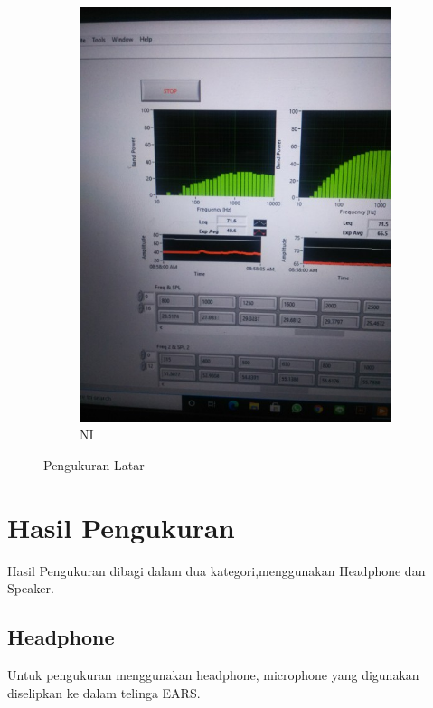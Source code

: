\documentclass[12pt,]{article}
\begin{document}
\begin{figure}[!ht]
\begin{subfigure}[b]{0.25\textwidth}
			\includegraphics[width=\textwidth]{images/noise_ni}
			\caption{NI}
		\end{subfigure}
		\caption{Pengukuran Latar}
	\end{figure}

	
	\newpage
	\section{Hasil Pengukuran}
	
	Hasil Pengukuran dibagi dalam dua kategori,menggunakan Headphone dan Speaker.
	
	\subsection{Headphone}
	
	Untuk pengukuran menggunakan headphone, microphone yang digunakan diselipkan ke dalam telinga EARS.
	
\end{document}
